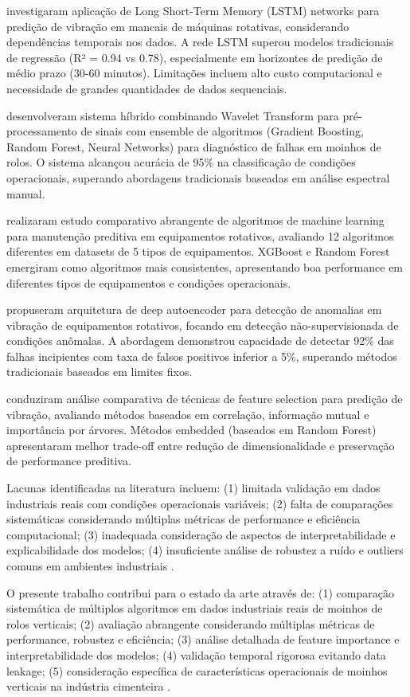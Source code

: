  investigaram aplicação de Long Short-Term Memory (LSTM) networks para predição de vibração em mancais de máquinas rotativas, considerando dependências temporais nos dados. A rede LSTM superou modelos tradicionais de regressão (R² = 0.94 vs 0.78), especialmente em horizontes de predição de médio prazo (30-60 minutos). Limitações incluem alto custo computacional e necessidade de grandes quantidades de dados sequenciais.

 desenvolveram sistema híbrido combinando Wavelet Transform para pré-processamento de sinais com ensemble de algoritmos (Gradient Boosting, Random Forest, Neural Networks) para diagnóstico de falhas em moinhos de rolos. O sistema alcançou acurácia de 95\% na classificação de condições operacionais, superando abordagens tradicionais baseadas em análise espectral manual.

 realizaram estudo comparativo abrangente de algoritmos de machine learning para manutenção preditiva em equipamentos rotativos, avaliando 12 algoritmos diferentes em datasets de 5 tipos de equipamentos. XGBoost e Random Forest emergiram como algoritmos mais consistentes, apresentando boa performance em diferentes tipos de equipamentos e condições operacionais.

 propuseram arquitetura de deep autoencoder para detecção de anomalias em vibração de equipamentos rotativos, focando em detecção não-supervisionada de condições anômalas. A abordagem demonstrou capacidade de detectar 92\% das falhas incipientes com taxa de falsos positivos inferior a 5\%, superando métodos tradicionais baseados em limites fixos.

 conduziram análise comparativa de técnicas de feature selection para predição de vibração, avaliando métodos baseados em correlação, informação mutual e importância por árvores. Métodos embedded (baseados em Random Forest) apresentaram melhor trade-off entre redução de dimensionalidade e preservação de performance preditiva.

Lacunas identificadas na literatura incluem: (1) limitada validação em dados industriais reais com condições operacionais variáveis; (2) falta de comparações sistemáticas considerando múltiplas métricas de performance e eficiência computacional; (3) inadequada consideração de aspectos de interpretabilidade e explicabilidade dos modelos; (4) insuficiente análise de robustez a ruído e outliers comuns em ambientes industriais \cite{carvalho2019systematic}.

O presente trabalho contribui para o estado da arte através de: (1) comparação sistemática de múltiplos algoritmos em dados industriais reais de moinhos de rolos verticais; (2) avaliação abrangente considerando múltiplas métricas de performance, robustez e eficiência; (3) análise detalhada de feature importance e interpretabilidade dos modelos; (4) validação temporal rigorosa evitando data leakage; (5) consideração específica de características operacionais de moinhos verticais na indústria cimenteira \cite{susto2015machine}.